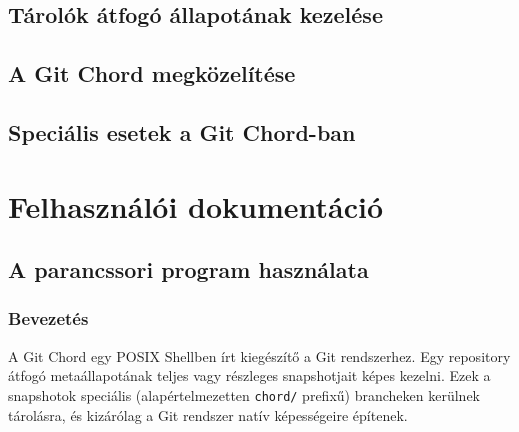 \documentclass[
]{elteikthesis}[2025/03/25]
\begin{document}


\section{Tárolók átfogó állapotának kezelése}


\section{A Git Chord megközelítése}


\section{Speciális esetek a Git Chord-ban}


\cleardoublepage

\chapter{Felhasználói dokumentáció}

\section{A parancssori program használata}

\subsection{Bevezetés}

A Git Chord egy POSIX Shellben írt kiegészítő a Git rendszerhez.
Egy repository átfogó metaállapotának teljes vagy részleges snapshotjait képes kezelni.
Ezek a snapshotok speciális (alapértelmezetten \texttt{chord/} prefixű) brancheken kerülnek tárolásra,
és kizárólag a Git rendszer natív képességeire építenek.
\end{document}
